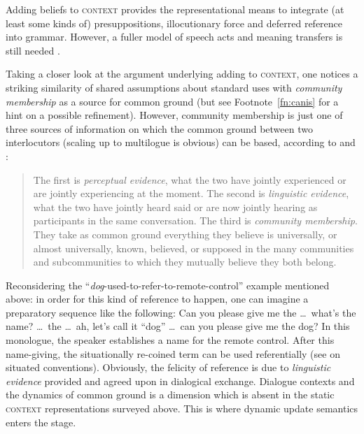 \documentclass[output=paper,biblatex,babelshorthands,newtxmath,draftmode,colorlinks,citecolor=brown]{langscibook}
\begin{document}
\noindent Adding beliefs to \textsc{context} provides the representational means to integrate (at least some kinds of) presuppositions, illocutionary force and deferred reference \citep{Nunberg:1978} into grammar.
%
However, a fuller model of speech acts and meaning transfers is still needed \citep[]{Kathol:Przepiorkowski:Tseng:2011}. %


Taking a closer look at the argument underlying adding  to \textsc{context}, one notices a striking similarity of shared assumptions about standard uses with \emph{community membership} as a source for common ground (but see Footnote~\ref{fn:canis} for a hint on a possible refinement).
%
However, community membership is just one of three sources of information on which the common ground between two interlocutors (scaling up to multilogue is obvious) can be based, according to \citet{Clark:Marshall:1981} and \citet{Clark:Schreuder:Buttrick:1983}:
%
\begin{quote}
The first is \emph{perceptual evidence}, what the two have jointly experienced or are jointly experiencing at the moment. The second is \emph{linguistic evidence}, what the two have jointly heard said or are now jointly hearing as participants in the same conversation. The third is \emph{community membership}. They take as common ground everything they believe is universally, or almost universally, known, believed, or supposed in the many communities and subcommunities to which they mutually believe they both belong. \hfill \citep[]{Clark:Schreuder:Buttrick:1983} 
\end{quote}


Reconsidering the \enquote{\emph{dog}-used-to-refer-to-remote-control} example mentioned above: in order for this kind of reference to happen, one can imagine a preparatory sequence like the following:
%
\ea
Can you please give me the \ldots\ what's the name? \ldots\ the \ldots\ ah, let's call it \enquote{dog} \ldots\ can you please give me the dog?
\z
% 
In this monologue, the speaker establishes a name for the remote control.
%
After this name-giving, the situationally re-coined term can be used referentially (see \citealt{Luecking:Rieser:Staudacher:2006:b} on situated conventions).
%
Obviously, the felicity of reference is due to \emph{linguistic evidence} provided and agreed upon in dialogical exchange.
%
Dialogue contexts \citep{Lee-Goldman:2011} and the dynamics of common ground is a dimension which is absent in the static \textsc{context} representations surveyed above.
%
This is where dynamic update semantics enters the stage.
\end{document}
